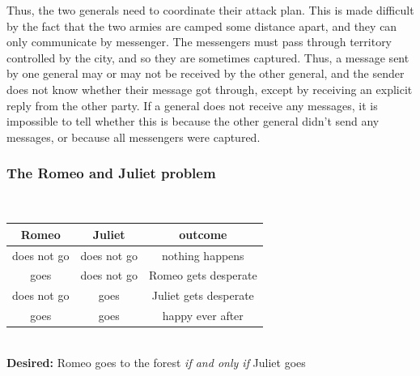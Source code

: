 Thus, the two generals need to coordinate their attack plan.
This is made difficult by the fact that the two armies are camped some distance apart, and they can only communicate by messenger.
The messengers must pass through territory controlled by the city, and so they are sometimes captured.
Thus, a message sent by one general may or may not be received by the other general, and the sender does not know whether their message got through, except by receiving an explicit reply from the other party.
If a general does not receive any messages, it is impossible to tell whether this is because the other general didn't send any messages, or because all messengers were captured.

\begin{frame}
    \label{s:romeo-juliet}
    \frametitle{The Romeo and Juliet problem}
    \begin{center}
        \\[1em]\pause
        \renewcommand{\arraystretch}{1.3}
        \begin{tabular}{c|c|c}
            \hline
            \textbf{Romeo} & \textbf{Juliet} & \textbf{outcome} \\\hline
            does not go & does not go & nothing happens \\
            goes & does not go & Romeo gets desperate \\
            does not go & goes & Juliet gets desperate \\
            goes & goes & happy ever after \\\hline
        \end{tabular}\\[1em]
        \textbf{Desired:} Romeo goes to the forest \emph{if and only if} Juliet goes
    \end{center}
\end{frame}
\label{l:romeo-juliet}

